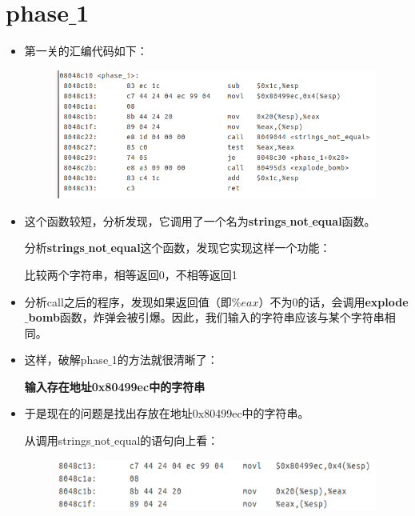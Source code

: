\section{phase$\_$1}
	\begin{itemize}
	\item	
	第一关的汇编代码如下：
	\begin{figure}[h]
		\centering
			\includegraphics[scale=0.77]{images/phase_1.png}
	\end{figure}

	\item	
	这个函数较短，分析发现，它调用了一个名为\textbf{strings$\_$not$\_$equal}函数。
	
	分析\textbf{strings$\_$not$\_$equal}这个函数，发现它实现这样一个功能：
	
	比较两个字符串，相等返回0，不相等返回1
	
	\item
	分析call之后的程序，发现如果返回值（即$\%eax$）不为0的话，会调用\textbf{explode$\_$bomb}函数，炸弹会被引爆。因此，我们输入的字符串应该与某个字符串相同。
	
	\item
	这样，破解phase$\_$1的方法就很清晰了：

		\begin{center}
			\textbf{输入存在地址0x80499ec中的字符串}
		\end{center}

	\item
	于是现在的问题是找出存放在地址0x80499ec中的字符串。
	
	从调用strings$\_$not$\_$equal的语句向上看：
	\begin{figure}[h]
		\centering
			\includegraphics[scale=0.77]{images/phase_1_part_0.png}	
	\end{figure}
	

\end{itemize}

